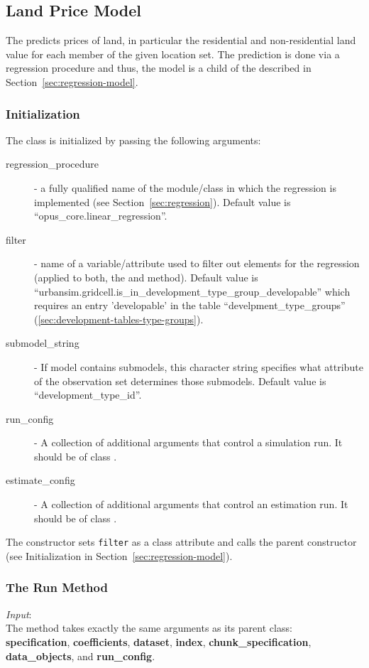 \subsection{Land Price Model}
\label{sec:land-price-model} 
\modelsindex
%
The  predicts prices of land, in particular the
residential and non-residential land value for each member of the given
location set. The prediction is done via a regression procedure and thus,
the model is a child of the  described in
Section~\ref{sec:regression-model}.

\subsubsection{Initialization}
%
The class is initialized by passing the following arguments:
\begin{description}
\item[regression_procedure] - a fully qualified name of the module/class in
  which the regression is implemented (see
  Section~\ref{sec:regression}). Default value is
  ``opus_core.linear_regression''.
\item[filter] - name of a variable/attribute used to filter out elements for
  the regression (applied to both, the  and 
  method). Default value is
  ``urbansim.gridcell.is_in_development_type_group_developable'' which requires an entry 'developable'
  in the table ``develpment_type_groups'' (\ref{sec:development-tables-type-groups}).
\item[submodel_string] - If model contains submodels, this character string
  specifies what attribute of the observation set determines those
  submodels. Default value is ``development_type_id''.
\item[run_config] - A collection of additional arguments that control a
  simulation run. It should be of class .
\item[estimate_config] - A collection of additional arguments that control an
  estimation run. It should be of class .
\end{description}
The constructor sets \verb|filter| as a class attribute and calls the parent
constructor (see Initialization in Section~\ref{sec:regression-model}).

\subsubsection{The Run Method}
%
{\it Input}:\\[1mm]
The  method takes exactly the same arguments as its parent
class:\\
{\bf specification}, {\bf coefficients}, {\bf dataset}, {\bf index}, {\bf
  chunk_specification}, {\bf data_objects}, and {\bf run_config}.



